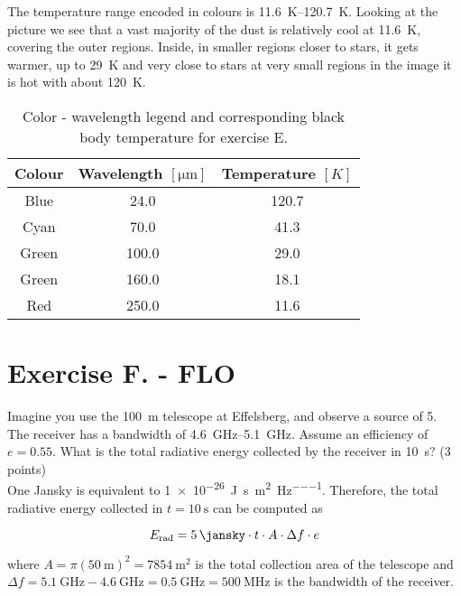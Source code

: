 \documentclass[11pt,a4paper,twoside]{article}
\begin{document}
The temperature range encoded in colours is \SIrange{11.6}{120.7}{\kelvin}.
Looking at the picture we see that a vast majority of the dust is relatively 
cool at \SI{11.6}{\kelvin}, covering the outer regions. Inside, in smaller
regions closer to stars, it gets warmer, up to \SI{29}{\kelvin} and very close
to stars at very small regions in the image it is hot with about
\SI{120}{\kelvin}.

\begin{table}[h!]
\centering
\begin{tabular}{ccc}\toprule
Colour  & Wavelength $[\si{\micro\meter}]$  & Temperature $[K]$  \\ \midrule
Blue    & 24.0  & 120.7                \\
Cyan    & 70.0  & 41.3                \\
Green   & 100.0 & 29.0                \\
Green   & 160.0 & 18.1                \\
Red     & 250.0 & 11.6               \\
\bottomrule
\end{tabular}
\caption{Color - wavelength legend and corresponding black body temperature for
         exercise E.}
\label{tab:col}
\end{table}


\section*{Exercise F. - FLO} 

Imagine you use the \SI{100}{\metre} telescope at Effelsberg, and observe a
source of \SI{5}{\jansky}. The receiver has a bandwidth of
\SIrange{4.6}{5.1}{\GHz}. Assume an efficiency of $e=\num{0.55}$. What is the total
radiative energy collected by the receiver in \SI{10}{\second}? (3 points) \\


One Jansky is equivalent to \SI{1e-26}{\joule\per\second\per\meter\squared\per\hertz}.
Therefore, the total radiative energy collected in $t = \SI{10}{\second}$ can
be computed as

\begin{equation}
 E_{\text{rad}} = \SI{5}{\jansky} \cdot t \cdot A \cdot \Delta f \cdot e
\end{equation}

where $A = \pi \left( \SI{50}{\metre} \right)^2 = \SI{7854}{\metre\squared}$ is
the total collection area of the telescope and $\Delta f = \SI{5.1}{\GHz} -
\SI{4.6}{\GHz} = \SI{0.5}{\GHz} = \SI{500}{\MHz}$ is the bandwidth of the
receiver. \\
\end{document}
